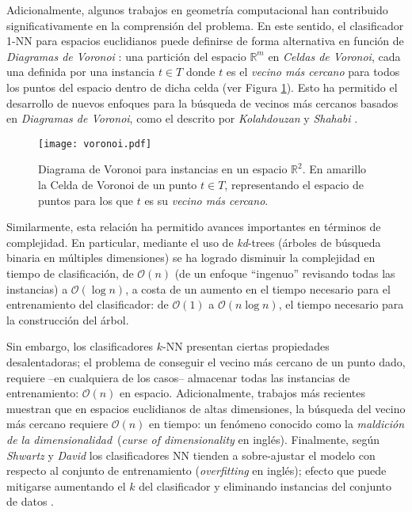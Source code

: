 Adicionalmente, algunos trabajos en geometría computacional han contribuido significativamente en la comprensión del problema. En este sentido, el clasificador 1-NN para espacios euclidianos puede definirse de forma alternativa en función de \emph{Diagramas de Voronoi} \cite{voronoi1908nouvelles}: una partición del espacio $\mathbb{R}^m$ en \emph{Celdas de Voronoi}, cada una definida por una instancia $t \in T$ donde $t$ es el \emph{vecino más cercano} para todos los puntos del espacio dentro de dicha celda (ver Figura \ref{voronoi}). Esto ha permitido el desarrollo de nuevos enfoques para la búsqueda de vecinos más cercanos basados en \emph{Diagramas de Voronoi}, como el descrito por \emph{Kolahdouzan} y \emph{Shahabi} \cite{Kolahdouzan:2004:VKN:1316689.1316762}.

\begin{figure}[h!]
\centering
\texttt{[image: voronoi.pdf]}
\caption[Diagramas de Voronoi y NN]{Diagrama de Voronoi para instancias en un espacio $\mathbb{R}^2$. En amarillo la Celda de Voronoi de un punto $t \in T$, representando el espacio de puntos para los que $t$ es su \emph{vecino más cercano}.}
\label{voronoi}
\end{figure}

Similarmente, esta relación ha permitido avances importantes en términos de complejidad. En particular, mediante el uso de \emph{kd}-trees \cite{Bentley:1975:MBS:361002.361007} (árboles de búsqueda binaria en múltiples dimensiones) se ha logrado disminuir la complejidad en tiempo de clasificación, de $\mathcal{O}(n)$ (de un enfoque ``ingenuo'' revisando todas las instancias) a $\mathcal{O}(\log{n})$, a costa de un aumento en el tiempo necesario para el entrenamiento del clasificador: de $\mathcal{O}(1)$ a $\mathcal{O}(n\log{n})$, el tiempo necesario para la construcción del árbol.

Sin embargo, los clasificadores $k$-NN presentan ciertas propiedades desalentadoras; el problema de conseguir el vecino más cercano de un punto dado, requiere --en cualquiera de los casos-- almacenar todas las instancias de entrenamiento: $\mathcal{O}(n)$ en espacio. Adicionalmente, trabajos más recientes \cite{DBLP:conf/soda/KrauthgamerL04} muestran que en espacios euclidianos de altas dimensiones, la búsqueda del vecino más cercano requiere $\mathcal{O}(n)$ en tiempo: un fenómeno conocido como la \guillemotleft\emph{maldición de la dimensionalidad}\guillemotright\ (\emph{curse of dimensionality} en inglés). Finalmente, según \emph{Shwartz} y \emph{David} \cite{shalev2014understanding} los clasificadores NN tienden a sobre-ajustar el modelo con respecto al conjunto de entrenamiento (\emph{overfitting} en inglés); efecto que puede mitigarse aumentando el $k$ del clasificador \cite{devroye1994strong, shalev2014understanding} y eliminando instancias del conjunto de datos \cite{DBLP:journals/corr/GottliebKK13}.

